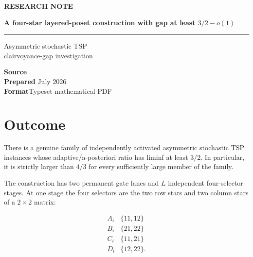 \documentclass[11pt,a4paper]{article}
\newenvironment{ResearchContents}
  {\begin{tcolorbox}[breakable,colback=SoftBlue,colframe=SoftBlue,arc=2pt]}
  {\end{tcolorbox}}
\begin{document}
\color{BodyGray}
\begin{titlepage}
  \thispagestyle{empty}
  \vspace*{22mm}
  {\sffamily\small\bfseries\color{Accent}\MakeUppercase{Research note}}\par
  \vspace{8mm}
  {\sffamily\fontsize{20}{24}\selectfont\bfseries\color{Navy} A four-star layered-poset construction with gap at least \(3/2-o(1)\)}\par
  \vspace{6mm}
  {\color{Accent}\rule{42mm}{1.4pt}}\par
  \vspace{11mm}
  {\Large\color{BodyGray} Asymmetric stochastic TSP\\
  clairvoyance-gap investigation}\par
  \vfill
  \begin{tcolorbox}[
    colback=SoftBlue,colframe=SoftBlue,arc=2pt,
    left=10pt,right=10pt,top=8pt,bottom=8pt]
    \sffamily
    \textbf{Source}\quad {}\\[3pt]
    \textbf{Prepared} July 2026\\[3pt]
    \textbf{Format}\quad Typeset mathematical PDF
  \end{tcolorbox}
  \vspace{12mm}
\end{titlepage}

\begin{ResearchContents}
\tableofcontents
\end{ResearchContents}
\clearpage

\section*{Outcome}

There is a genuine family of independently activated asymmetric stochastic TSP instances whose adaptive/a-posteriori ratio has liminf at least \(3/2\).  In particular, it is strictly larger than \(4/3\) for every sufficiently large member of the family.


The construction has two permanent gate lanes and \(L\) independent four-selector stages.  At one stage the four selectors are the two row stars and two column stars of a \(2\times2\) matrix:


\begin{equation}
\begin{array}{c|c}
 A_i&\{11,12\}\\
 B_i&\{21,22\}\\
 C_i&\{11,21\}\\
 D_i&\{12,22\}.
\end{array}
\tag{0.1}
\end{equation}
\end{document}
